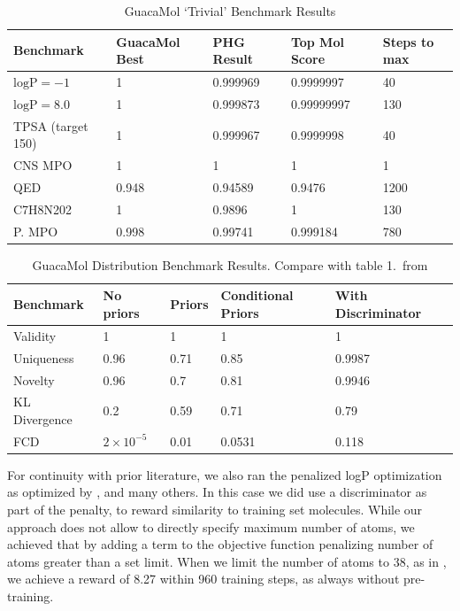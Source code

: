 \documentclass{article}
\begin{document}
\begin{table}
    \caption{GuacaMol `Trivial' Benchmark Results}
    \label{tab:guac-trivial}
    \centering
    \begin{tabular}{lllll}
        \toprule
        Benchmark & GuacaMol Best & PHG Result & Top Mol Score & Steps to max \\
        \midrule
        $\text{logP} = -1$ & 1 & 0.999969 & 0.9999997 & 40 \\
        $\text{logP} = 8.0$ & 1 & 0.999873 & 0.99999997 & 130 \\
        TPSA (target 150) & 1 & 0.999967 & 0.9999998 & 40 \\
        CNS MPO & 1 & 1 & 1 & 1 \\
        QED & 0.948 & 0.94589 & 0.9476 & 1200 \\
        C7H8N202 & 1 & 0.9896 & 1 & 130 \\
        P. MPO & 0.998 & 0.99741 & 0.999184 & 780 \\
        \bottomrule
    \end{tabular}
\end{table}

\begin{table}
    \caption{GuacaMol Distribution Benchmark Results. Compare with table 1.~from \cite{brown2019}}
    \label{tab:distr}
    \centering
    \begin{tabular}{lllll}
        \toprule
        Benchmark & No priors & Priors & Conditional Priors & With Discriminator \\
        \midrule
        Validity & 1 & 1 & 1 & 1 \\
        Uniqueness & 0.96 & 0.71 & 0.85 & 0.9987 \\
        Novelty & 0.96 & 0.7 & 0.81 & 0.9946 \\
        KL Divergence & 0.2 & 0.59 & 0.71 & 0.79 \\
        FCD & $2 \times 10^{-5}$ & 0.01 & 0.0531 & 0.118 \\
        \bottomrule
    \end{tabular}
\end{table}

For continuity with prior literature, we also ran the penalized logP optimization as optimized by \cite{kusner2017, you2018}, and many others. In this case we did use a discriminator as part of the penalty, to reward similarity to training set molecules. While our approach does not allow to directly specify maximum number of atoms, we achieved that by adding a term to the objective function penalizing number of atoms greater than a set limit. When we limit the number of atoms to 38, as in \cite{you2018}, we achieve a reward of 8.27 within 960 training steps, as always without pre-training.
\end{document}
